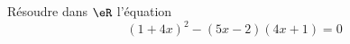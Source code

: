 
\begin{exercice}\label{exosmath-0222}

    Résoudre dans \( \eR\) l'équation
    \begin{equation}
        (1+4x)^2-(5x-2)(4x+1)=0
    \end{equation}

\end{exercice}
